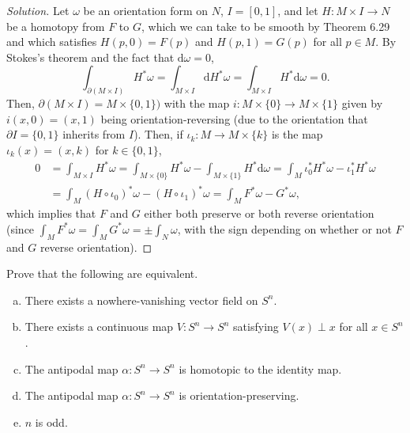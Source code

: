 \documentclass[10pt]{article}
\newcommand{\dd}{\mathrm{d}}
\providecommand{\ii}{\item}
\newenvironment{soln}{\begin{proof}[Solution]}{\end{proof}}
\begin{document}
\begin{soln}
    Let $\omega$ be an orientation form on $N$, $I = [0,1]$,
    and let $H\colon M\times I\to N$ be a homotopy from $F$ to $G$,
    which we can take to be smooth by Theorem 6.29
    and which satisfies $H(p,0) = F(p)$ and $H(p,1) = G(p)$ for all $p\in M$.
    By Stokes's theorem and the fact that $\dd\omega = 0$,
    \begin{equation*}
	\int_{\partial(M\times I)} H^*\omega
	= \int_{M\times I} \dd H^*\omega
	= \int_{M\times I} H^*\dd\omega = 0.
    \end{equation*}
    Then, $\partial(M\times I) = M\times\{0,1\})$
    with the map $i\colon M\times\{0\}\to M\times\{1\}$
    given by $i(x,0) = (x,1)$ being orientation-reversing
    (due to the orientation that $\partial I = \{0,1\}$ inherits from $I$).
    Then, if $\iota_k \colon M\to M\times\{k\}$ is the map
    $\iota_k(x) = (x,k)$ for $k\in\{0,1\}$,
    \begin{align*}
	0 &= \int_{M\times I}H^*\omega
	= \int_{M\times\{0\}} H^*\omega - \int_{M\times\{1\}} H^*\dd\omega
	= \int_M \iota_0^* H^*\omega - \iota_1^* H^*\omega\\
	&= \int_M (H\circ\iota_0)^*\omega - (H\circ\iota_1)^*\omega
	= \int_M F^*\omega - G^*\omega,
    \end{align*}
    which implies that $F$ and $G$ either both preserve
    or both reverse orientation
    (since $\int_M F^*\omega = \int_M G^*\omega = \pm\int_N \omega$,
    with the sign depending on whether or not $F$ and $G$ reverse orientation).
\end{soln}

\begin{problem}
    [16-6]
    Prove that the following are equivalent.
    \begin{enumerate}[(a)]
        \ii There exists a nowhere-vanishing vector field on $S^n$.
	\ii There exists a continuous map $V\colon S^n\to S^n$
	satisfying $V(x)\perp x$ for all $x\in S^n$.
	\ii The antipodal map $\alpha\colon S^n\to S^n$
	is homotopic to the identity map.
	\ii The antipodal map $\alpha\colon S^n\to S^n$
	is orientation-preserving.
	\ii $n$ is odd.
    \end{enumerate}
\end{problem}
\end{document}
